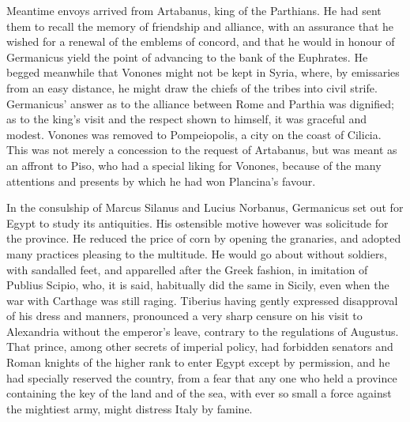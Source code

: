 
Meantime envoys arrived from Artabanus, king of the Parthians. He had sent them to recall the memory of friendship and alliance, with an assurance that he wished for a renewal of the emblems of concord, and that he would in honour of Germanicus yield the point of advancing to the bank of the Euphrates. He begged meanwhile that Vonones might not be kept in Syria, where, by emissaries from an easy distance, he might draw the chiefs of the tribes into civil strife. Germanicus' answer as to the alliance between Rome and Parthia was dignified; as to the king's visit and the respect shown to himself, it was graceful and modest. Vonones was removed to Pompeiopolis, a city on the coast of Cilicia. This was not merely a concession to the request of Artabanus, but was meant as an affront to Piso, who had a special liking for Vonones, because of the many attentions and presents by which he had won Plancina's favour.


In the consulship of Marcus Silanus and Lucius Norbanus, Germanicus set out for Egypt to study its antiquities. His ostensible motive however was solicitude for the province. He reduced the price of corn by opening the granaries, and adopted many practices pleasing to the multitude. He would go about without soldiers, with sandalled feet, and apparelled after the Greek fashion, in imitation of Publius Scipio, who, it is said, habitually did the same in Sicily, even when the war with Carthage was still raging. Tiberius having gently expressed disapproval of his dress and manners, pronounced a very sharp censure on his visit to Alexandria without the emperor's leave, contrary to the regulations of Augustus. That prince, among other secrets of imperial policy, had forbidden senators and Roman knights of the higher rank to enter Egypt except by permission, and he had specially reserved the country, from a fear that any one who held a province containing the key of the land and of the sea, with ever so small a force against the mightiest army, might distress Italy by famine.


